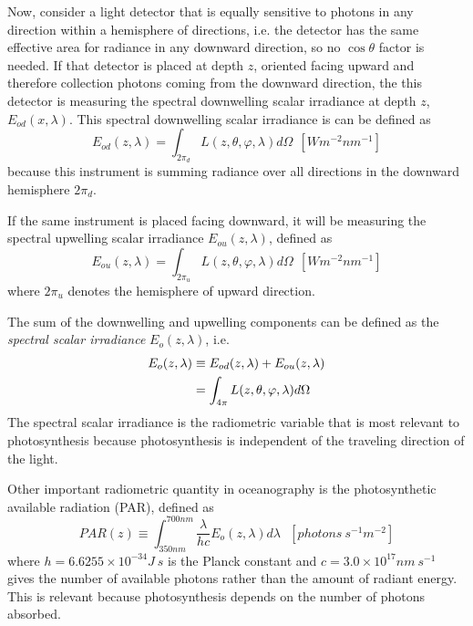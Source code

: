Now, consider a light detector that is equally sensitive to photons in any direction within a hemisphere of directions, i.e. the detector has the same effective area for radiance in any downward direction, so no $\cos{\theta}$ factor is needed. If that detector is placed at depth $z$, oriented facing upward and therefore collection photons coming from the downward direction, the this detector is measuring the spectral downwelling scalar irradiance at depth $z$, $E_{od}(x,\lambda)$. This spectral downwelling scalar irradiance is can be defined as
\begin{equation}\label{eq:Eod}
  E_{od}(z,\lambda)=\int_{2\pi_d} L(z,\theta,\varphi,\lambda)d\Omega~~\left[Wm^{-2}nm^{-1} \right]
\end{equation}
because this instrument is summing radiance over all directions in the downward hemisphere $2\pi_d$.

If the same instrument is placed facing downward, it will be measuring the spectral upwelling scalar irradiance $ E_{ou}(z,\lambda)$, defined as
\begin{equation}
  E_{ou}(z,\lambda)=\int_{2\pi_u} L(z,\theta,\varphi,\lambda)d\Omega~~\left[Wm^{-2}nm^{-1} \right]
\end{equation}
where $2\pi_u$ denotes the hemisphere of upward direction.

The sum of the downwelling and upwelling components can be defined as the {\it spectral scalar irradiance} $E_o(z,\lambda)$, i.e.
\begin{align}
  E_{o}(z,\lambda) &\equiv E_{od}(z,\lambda)+E_{ou}(z,\lambda)\notag \\
           &=\int_{4\pi} L(z,\theta,\varphi,\lambda)d\Omega
\end{align}
The spectral scalar irradiance is the radiometric variable that is most relevant to photosynthesis because photosynthesis is independent of the traveling direction of the light.

Other important radiometric quantity in oceanography is the photosynthetic available radiation (PAR), defined as
\begin{equation}
  PAR(z)\equiv \int_{350nm}^{700nm} \frac{\lambda}{hc}E_o(z,\lambda)d\lambda~~~\left[photons~s^{-1}m^{-2} \right]
\end{equation}
where $h=6.6255\times10^{-34}J~s$ is the Planck constant and $c=3.0\times10^{17}nm~s^{-1}$ gives the number of available photons rather than the amount of radiant energy. This is relevant because photosynthesis depends on the number of photons absorbed.



